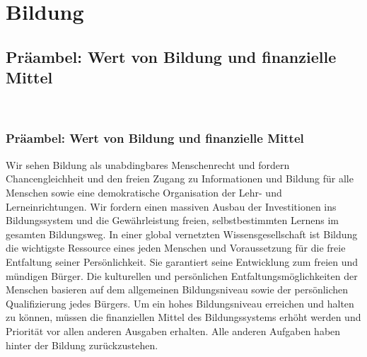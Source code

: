\section{Bildung}

\subsection*{Präambel: Wert von Bildung und finanzielle Mittel}
\\
\abstimmung

\subsubsection{Präambel: Wert von Bildung und finanzielle Mittel}
Wir sehen Bildung als unabdingbares Menschenrecht und fordern Chancengleichheit und den freien Zugang zu Informationen und Bildung für alle Menschen sowie eine demokratische Organisation der Lehr- und Lerneinrichtungen. Wir fordern einen massiven Ausbau der Investitionen ins Bildungssystem und die Gewährleistung freien, selbstbestimmten Lernens im gesamten Bildungsweg. In einer global vernetzten Wissensgesellschaft ist Bildung die wichtigste Ressource eines jeden Menschen und Voraussetzung für die freie Entfaltung seiner Persönlichkeit. Sie garantiert seine Entwicklung zum freien und mündigen Bürger. Die kulturellen und persönlichen Entfaltungsmöglichkeiten der Menschen basieren auf dem allgemeinen Bildungsniveau sowie der persönlichen Qualifizierung jedes Bürgers. Um ein hohes Bildungsniveau erreichen und halten zu können, müssen die finanziellen Mittel des Bildungssystems erhöht werden und Priorität vor allen anderen Ausgaben erhalten. Alle anderen Aufgaben haben hinter der Bildung zurückzustehen.


